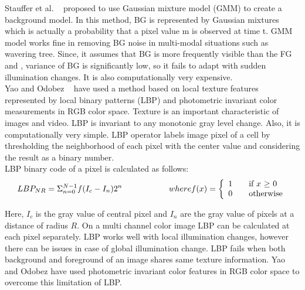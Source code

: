 \indent  Stauffer et al. ~\cite{15} proposed to use Gaussian mixture
model (GMM) to create a background model. In this method, BG is
represented by Gaussian mixtures which is actually a probability that a
pixel value m is observed at time t. GMM model works fine in removing BG
noise in multi-modal situations such as wavering tree. Since, it assumes
that BG is more frequently visible than the FG and , variance of BG is
significantly low, so it fails to adapt with sudden illumination
changes. It is also computationally very expensive.\\ 

\indent Yao and Odobez ~\cite{11} have used a method based on local
texture features represented by local binary patterns (LBP) and
photometric invariant color measurements in RGB color space. Texture is
an important characteristic of images and video. LBP is invariant to any
monotonic gray level change. Also, it is computationally very simple.
LBP operator labels image pixel of a cell by thresholding the
neighborhood of each pixel with the center value and considering the
result as a binary number.\\

LBP binary code of a pixel is calculated as follows:
\begin{equation}
LBP_{NR} = \Sigma _{n = 0} ^{N - 1} f(I_c - I_n) 2^n \hspace{20 mm} where f(x) = \left\{ 
  \begin{array}{l l}
     1 & \quad \text{if $x$ $\geq$  $0$}\\
     0 & \quad \text{otherwise}
   \end{array} \right.
\end{equation}

\indent Here, $I_c$ is the gray value of central pixel and $I_n$ are the gray
value of pixels at a distance of radius $R$.  On a multi channel color
image LBP can be calculated at each pixel separately. LBP works well with
local illumination changes, however there can be issues in case of
global illumination change. LBP fails when both background and foreground
of an image shares same texture information. Yao and Odobez have used
photometric invariant color features in RGB color space to overcome this
limitation of LBP.\\

